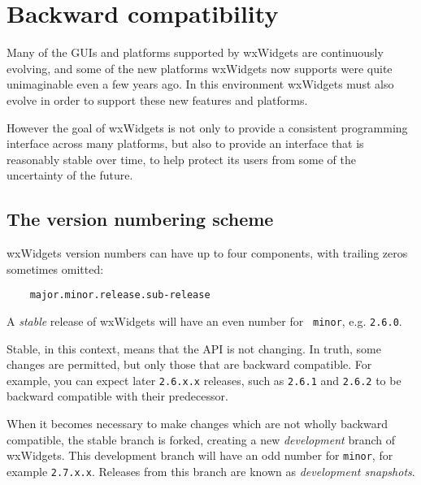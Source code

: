 
\section{Backward compatibility}\label{backwardcompatibility}

Many of the GUIs and platforms supported by wxWidgets are continuously
evolving, and some of the new platforms wxWidgets now supports were quite
unimaginable even a few years ago. In this environment wxWidgets must also
evolve in order to support these new features and platforms.

However the goal of wxWidgets is not only to provide a consistent
programming interface across many platforms, but also to provide an
interface that is reasonably stable over time, to help protect its users
from some of the uncertainty of the future.

\subsection{The version numbering scheme}\label{versionnumbering}

wxWidgets version numbers can have up to four components, with trailing
zeros sometimes omitted:

\begin{verbatim}
    major.minor.release.sub-release
\end{verbatim}

A {\em stable} release of wxWidgets will have an even number for {\tt
minor}, e.g. {\tt 2.6.0}.

Stable, in this context, means that the API is not changing. In truth, some
changes are permitted, but only those that are backward compatible. For
example, you can expect later {\tt 2.6.x.x} releases, such as {\tt 2.6.1}
and {\tt 2.6.2} to be backward compatible with their predecessor.

When it becomes necessary to make changes which are not wholly backward
compatible, the stable branch is forked, creating a new {\em development}
branch of wxWidgets. This development branch will have an odd number
for {\tt minor}, for example {\tt 2.7.x.x}. Releases from this branch are
known as {\em development snapshots}.


